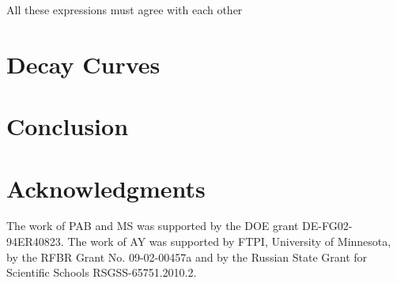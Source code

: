 \documentclass[epsfig,12pt]{article}
\begin{document}
\vspace{0.2cm}
       All these expressions must agree with each other


\newpage
\section{Decay Curves}
\setcounter{equation}{0}






\newpage

\section{Conclusion}
\label{conclu}
\setcounter{equation}{0}

\section*{Acknowledgments}
The work of PAB and MS was supported by the DOE grant DE-FG02-94ER40823.
The work of AY was  supported
by  FTPI, University of Minnesota,
by the RFBR Grant No. 09-02-00457a
and by the Russian State Grant for
Scientific Schools RSGSS-65751.2010.2.
	
	
\end{document}
